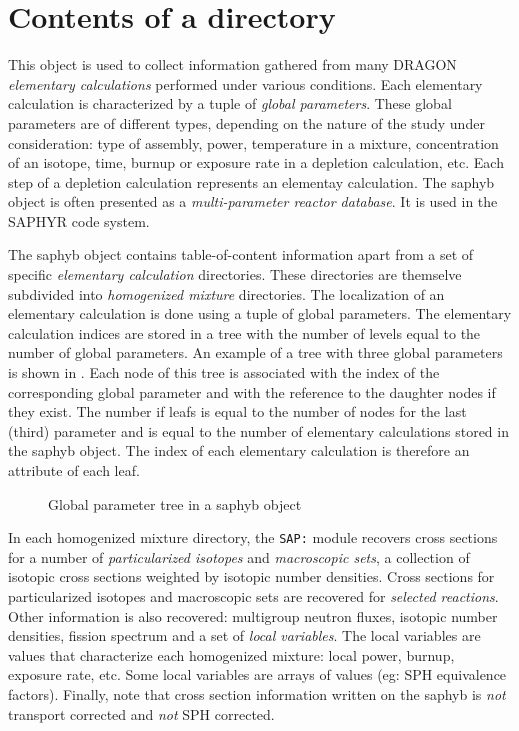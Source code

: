 \section{Contents of a  directory}\label{sect:sapdir}

This object is used to collect information gathered
from many DRAGON {\sl elementary calculations} performed under various conditions.
Each elementary calculation is characterized by a tuple of {\sl global parameters}.
These global parameters are of different types, depending on the nature of the
study under consideration: type of assembly, power, temperature in a mixture,
concentration of an isotope, time, burnup or exposure rate in a depletion calculation,
etc. Each step of a depletion calculation represents an elementay calculation.
The {\sc saphyb} object is often presented as a {\sl multi-parameter reactor database}.
It is used in the SAPHYR code system.

\vskip 0.1cm

The {\sc saphyb} object contains table-of-content information apart from a set of specific
{\sl elementary calculation} directories. These directories are themselve subdivided
into {\sl homogenized mixture} directories. The localization of an elementary calculation
is done using a tuple of global parameters. The elementary calculation indices are
stored in a tree with the number of levels equal to the number of global parameters.
An example of a tree with three global parameters is shown in . Each node
of this tree is associated with the index of the corresponding global parameter and with the
reference to the daughter nodes if they exist. The number if leafs is equal to the number
of nodes for the last (third) parameter and is equal to the number of elementary
calculations stored in the {\sc saphyb} object. The index of each elementary calculation is
therefore an attribute of each leaf.

\begin{figure}[h!]  
\begin{center} 
\epsfxsize=12cm
\centerline{ }
\parbox{14cm}{\caption{Global parameter tree in a {\sc saphyb} object}\label{fig:tree}}   
\end{center}  
\end{figure}

\vskip 0.1cm

In each homogenized mixture directory, the {\tt SAP:} module recovers
cross sections for a number of {\sl particularized isotopes} and {\sl macroscopic
sets}, a collection of isotopic cross sections weighted by isotopic number densities.
Cross sections for particularized isotopes and macroscopic sets are recovered for
{\sl selected reactions}. Other information is also recovered: multigroup neutron
fluxes, isotopic number densities, fission spectrum and a set
of {\sl local variables}. The local variables are values that characterize each
homogenized mixture: local power, burnup, exposure rate, etc. Some local variables
are arrays of values (eg: SPH equivalence factors). Finally, note that cross section
information written on the {\sc saphyb} is {\sl not} transport corrected and {\sl not}
SPH corrected.

